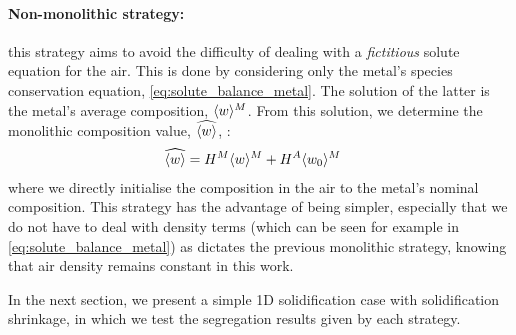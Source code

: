 \paragraph{Non-monolithic strategy:}
this strategy aims to avoid the difficulty of dealing with a \emph{fictitious} solute equation for the air.
This is done by considering only the metal's species conservation equation, \cref{eq:solute_balance_metal}.
The solution of the latter is the metal's average composition, $\langle w \rangle^M$. From this solution, we determine the monolithic
composition value, $\widehat{\langle w \rangle}$, :  
\begin{align}
\label{eq:nonmonolithic_solute}
& \widehat{\langle w \rangle} = H^M \langle w \rangle^M + H^A \langle w_0 \rangle^M     
\end{align}
where we directly initialise the composition in the air to the metal's nominal composition.
This strategy has the advantage of being simpler, especially that we do not have to deal with density terms
(which can be seen for example in \cref{eq:solute_balance_metal}) 
as dictates the previous monolithic strategy, knowing that air density remains constant in this work.

In the next section, we present a simple 1D solidification case with solidification shrinkage, in which we test
the segregation results given by each strategy.



